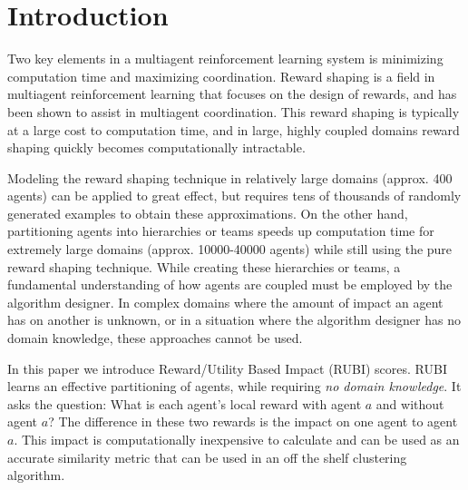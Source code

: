 \documentclass{aamas2014}
\begin{document}






\section{Introduction}
Two key elements in a multiagent reinforcement learning system is minimizing computation time and maximizing coordination. Reward shaping is a field in multiagent reinforcement learning that focuses on the design of rewards, and has been shown to assist in multiagent coordination. This reward shaping is typically at a large cost to computation time, and in large, highly coupled domains reward shaping quickly becomes computationally intractable. 

Modeling the reward shaping technique \cite{Proper:2012:MDR:2343896.2344025} in relatively large domains (approx. 400 agents) can be applied to great effect, but requires tens of thousands of randomly generated examples to obtain these approximations. On the other hand, partitioning agents into hierarchies \cite{tumer-holmesparker_ala12} or teams \cite{Curran:2013:AHC:2484920.2485183} speeds up computation time for extremely large domains (approx. 10000-40000 agents) while still using the pure reward shaping technique. While creating these hierarchies or teams, a fundamental understanding of how agents are coupled must be employed by the algorithm designer. In complex domains where the amount of impact an agent has on another is unknown, or in a situation where the algorithm designer has no domain knowledge, these approaches cannot be used. 

In this paper we introduce Reward/Utility Based Impact (RUBI) scores. RUBI learns an effective partitioning of agents, while requiring \textit{no domain knowledge}. It asks the question: What is each agent's local reward with agent $a$ and without agent $a$? The difference in these two rewards is the impact on one agent to agent $a$. This impact is computationally inexpensive to calculate and can be used as an accurate similarity metric that can be used in an off the shelf clustering algorithm. 
\end{document}
